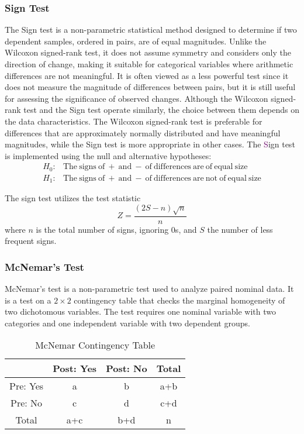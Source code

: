 \subsubsection{Sign Test}
\hfill \break
The Sign test is a non-parametric statistical method designed to determine if two dependent samples, ordered in pairs, are of equal magnitudes. Unlike the Wilcoxon signed-rank test, it does not assume symmetry and considers only the direction of change, making it suitable for categorical variables where arithmetic differences are not meaningful. It is often viewed as a less powerful test since it does not measure the magnitude of differences between pairs, but it is still useful for assessing the significance of observed changes. Although the Wilcoxon signed-rank test and the Sign test operate similarly, the choice between them depends on the data characteristics. The Wilcoxon signed-rank test is preferable for differences that are approximately normally distributed and have meaningful magnitudes, while the Sign test is more appropriate in other cases. The \textcolor{purple}{S}ign test is implemented using the null and alternative hypotheses:
\begin{equation}
\begin{array}{rl}
	H_0 : & \mathrm{The\ signs\ of\ +\ and\ -\ of\ differences\ are\ of\ equal\ size} \\
	H_1 : & \mathrm{The\ signs\ of\ +\ and\ -\ of\ differences\ are\ not\ of\ equal\ size}
\end{array}
\end{equation}

The sign test utilizes the test statistic
\begin{equation}
	Z = \frac{(2S - n)\sqrt{n}}{n}
\end{equation}
where $n$ is the total number of signs, ignoring 0s, and $S$ the number of less frequent signs.

\subsubsection{McNemar's Test}
\hfill \break
McNemar's test is a non-parametric test used to analyze paired nominal data. It is a test on a $2\times 2$ contingency table that checks the marginal homogeneity of two dichotomous variables. The test requires one nominal variable with two categories and one independent variable with two dependent groups.

\begin{table}[ht]
\centering
\begin{tabular}{ |c|c|c|c| } 
	\hline
	 & Post: Yes & Post: No & Total \\
	\hline
	Pre: Yes & a & b & a+b \\ 
	Pre: No & c & d & c+d \\
	Total & a+c & b+d & n \\
	\hline
\end{tabular}
\caption{McNemar Contingency Table}
\label{tab:mcnemar}
\end{table}

